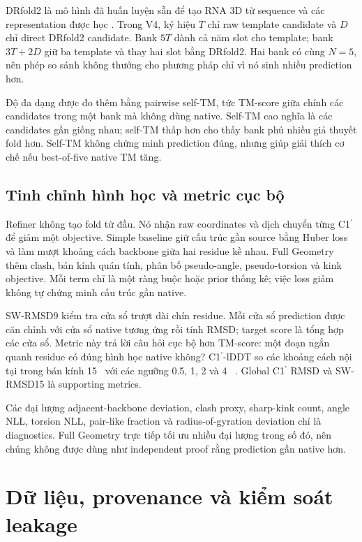 \documentclass[12pt,a4paper,oneside]{report}
\newcommand{\cprime}{C1$^{\prime}$}
\newcommand{\angstrom}{\text{\AA}}
\begin{document}
DRfold2 là mô hình đã huấn luyện sẵn để tạo RNA 3D từ sequence và các representation
được học \cite{drfold,drfold2}. Trong V4, ký hiệu $T$ chỉ raw template candidate và
$D$ chỉ direct DRfold2 candidate. Bank $5T$ dành cả năm slot cho template; bank
$3T+2D$ giữ ba template và thay hai slot bằng DRfold2. Hai bank có cùng $N=5$, nên
phép so sánh không thưởng cho phương pháp chỉ vì nó sinh nhiều prediction hơn.

Độ đa dạng được đo thêm bằng pairwise self-TM, tức TM-score giữa chính các candidates
trong một bank mà không dùng native. Self-TM cao nghĩa là các candidates gần giống
nhau; self-TM thấp hơn cho thấy bank phủ nhiều giả thuyết fold hơn. Self-TM không chứng
minh prediction đúng, nhưng giúp giải thích cơ chế nếu best-of-five native TM tăng.

\section{Tinh chỉnh hình học và metric cục bộ}

Refiner không tạo fold từ đầu. Nó nhận raw coordinates và dịch chuyển từng \cprime{}
để giảm một objective. Simple baseline giữ cấu trúc gần source bằng Huber loss và làm
mượt khoảng cách backbone giữa hai residue kề nhau. Full Geometry thêm clash, bán kính
quán tính, phân bố pseudo-angle, pseudo-torsion và kink objective. Mỗi term chỉ là một
ràng buộc hoặc prior thống kê; việc loss giảm không tự chứng minh cấu trúc gần native.

SW-RMSD9 kiểm tra cửa sổ trượt dài chín residue. Mỗi cửa sổ prediction được căn chỉnh
với cửa sổ native tương ứng rồi tính RMSD; target score là tổng hợp các cửa sổ. Metric
này trả lời câu hỏi cục bộ hơn TM-score: một đoạn ngắn quanh residue có đúng hình học
native không? C1$^{\prime}$-lDDT so các khoảng cách nội tại trong bán kính 15~\angstrom{}
với các ngưỡng 0.5, 1, 2 và 4~\angstrom{} \cite{lddt}. Global C1$^{\prime}$ RMSD và
SW-RMSD15 là supporting metrics.

Các đại lượng adjacent-backbone deviation, clash proxy, sharp-kink count, angle NLL,
torsion NLL, pair-like fraction và radius-of-gyration deviation chỉ là diagnostics.
Full Geometry trực tiếp tối ưu nhiều đại lượng trong số đó, nên chúng không được dùng
như independent proof rằng prediction gần native hơn.

\chapter{Dữ liệu, provenance và kiểm soát leakage}
\end{document}
